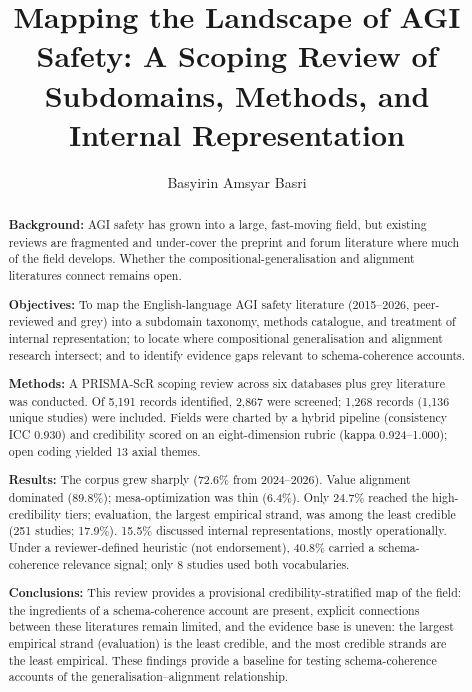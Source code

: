 

\title{Mapping the Landscape of AGI Safety: A Scoping Review of Subdomains, Methods, and Internal Representation}

\author{Basyirin Amsyar Basri}



\begin{abstract}
\textbf{Background:} AGI safety has grown into a large, fast-moving field, but existing reviews are fragmented and under-cover the preprint and forum literature where much of the field develops. Whether the compositional-generalisation and alignment literatures connect remains open.

\textbf{Objectives:} To map the English-language AGI safety literature (2015--2026, peer-reviewed and grey) into a subdomain taxonomy, methods catalogue, and treatment of internal representation; to locate where compositional generalisation and alignment research intersect; and to identify evidence gaps relevant to schema-coherence accounts.

\textbf{Methods:} A PRISMA-ScR scoping review across six databases plus grey literature was conducted. Of 5,191 records identified, 2,867 were screened; 1,268 records (1,136 unique studies) were included. Fields were charted by a hybrid pipeline (consistency ICC 0.930) and credibility scored on an eight-dimension rubric (kappa 0.924--1.000); open coding yielded 13 axial themes.

\textbf{Results:} The corpus grew sharply (72.6\% from 2024--2026). Value alignment dominated (89.8\%); mesa-optimization was thin (6.4\%). Only 24.7\% reached the high-credibility tiers; evaluation, the largest empirical strand, was among the least credible (251 studies; 17.9\%). 15.5\% discussed internal representations, mostly operationally. Under a reviewer-defined heuristic (not endorsement), 40.8\% carried a schema-coherence relevance signal; only 8 studies used both vocabularies.

\textbf{Conclusions:} This review provides a provisional credibility-stratified map of the field: the ingredients of a schema-coherence account are present, explicit connections between these literatures remain limited, and the evidence base is uneven: the largest empirical strand (evaluation) is the least credible, and the most credible strands are the least empirical. These findings provide a baseline for testing schema-coherence accounts of the generalisation--alignment relationship.
\end{abstract}

